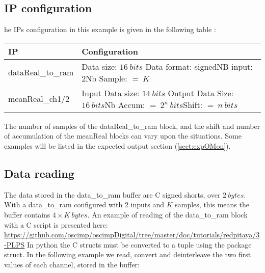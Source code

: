 \documentclass[12pt,oneside]{article}
\begin{document}
\vspace{0.0cm}
\subsection{IP configuration}
he IPs configuration in this example is given in the following table :

\begin{center}
	\begin{tabular}{|>{\centering\arraybackslash}m{.3\linewidth} | >{\centering\arraybackslash}m{.3\linewidth} |}
		\hline
		IP & Configuration \\
		\hline
		dataReal\_to\_ram&Data size: $16~bits$ \newline Data format: signed\newline NB input: $2$\newline Nb Sample: $=~K$\\
		\hline
		meanReal\_ch1/2&Input Data size: $14~bits$ \newline Output Data Size: $16~bits$\newline Nb Accum: $=~2^n~bits$\newline Shift: $=~n~bits$\\
		\hline
	\end{tabular}
\end{center}
\vspace{0.2cm}

The number of samples of the dataReal\_to\_ram block, and the shift and number of accumulation of the meanReal blocks can vary upon the situations. Some examples will be listed in the expected output section (\ref*{sect:expOMon}). 

\subsection{Data reading}\label{sect:datareading}

The data stored in the data\_to\_ram buffer are C signed shorts, over $2~bytes$. With a data\_to\_ram configured with $2$ inputs and $K$ samples, this means the buffer contains ${4\times K~bytes}$. An example of reading of the data\_to\_ram block with a C script is presented here:
\newline
\href{https://github.com/oscimp/oscimpDigital/tree/master/doc/tutorials/redpitaya/3-PLPS}{https://github.com/oscimp/oscimpDigital/tree/master/doc/tutorials/redpitaya/3-PLPS}
\newline\newline
In python the C structs must be converted to a tuple using the package struct. In the following example we read, convert and deinterleave the two first values of each channel, stored in the buffer:
\end{document}
